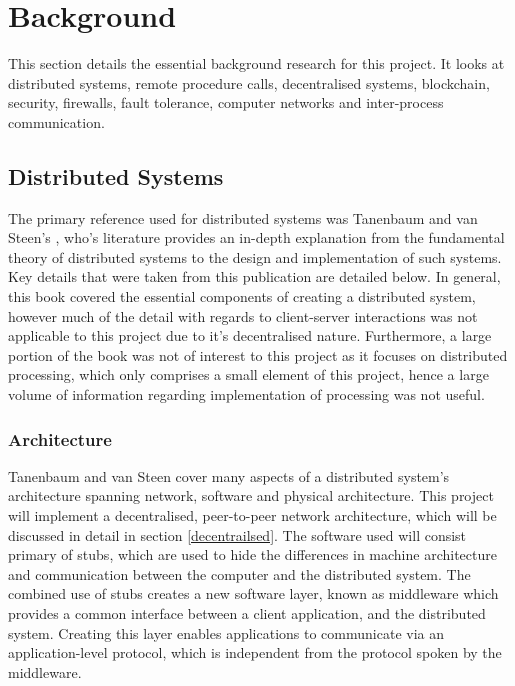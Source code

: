 \documentclass[a4paper, 11pt]{report}
\begin{document}
\chapter{Background}
This section details the essential background research for this project. It looks at distributed systems, remote procedure calls, decentralised systems, blockchain, security, firewalls, fault tolerance, computer networks and inter-process communication.

\section{Distributed Systems} \label{dist}
The primary reference used for distributed systems was Tanenbaum and van Steen's \cite{tanenbaumdist}, who's literature provides an in-depth explanation from the fundamental theory of distributed systems to the design and implementation of such systems. Key details that were taken from this publication are detailed below. In general, this book covered the essential components of creating a distributed system, however much of the detail with regards to client-server interactions was not applicable to this project due to it's decentralised nature. Furthermore, a large portion of the book was not of interest to this project as it focuses on distributed processing, which only comprises a small element of this project, hence a large volume of information regarding implementation of processing was not useful.

\subsection{Architecture}
Tanenbaum and van Steen cover many aspects of a distributed system's architecture spanning network, software and physical architecture. This project will implement a decentralised, peer-to-peer network architecture, which will be discussed in detail in section \ref{decentrailsed}. The software used will consist primary of \gls{stub}s, which are used to hide the differences in machine architecture and communication between the computer and the distributed system. The combined use of \gls{stub}s creates a new software layer, known as \gls{middleware} which provides a common interface between a client application, and the distributed system. Creating this layer enables applications to communicate via an application-level protocol, which is independent from the protocol spoken by the \gls{middleware}.
\end{document}
